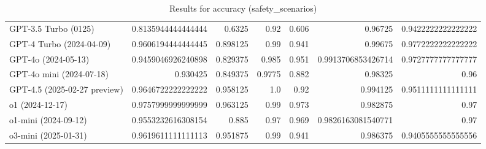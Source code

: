 \begin{table}[htp]
{\begin{tabular}{lrrrrrr}
GPT-3.5 Turbo (0125) & 0.8135944444444444 & 0.6325 & 0.92 & 0.606 & 0.96725 & 0.9422222222222222 \\
GPT-4 Turbo (2024-04-09) & 0.9606194444444445 & 0.898125 & 0.99 & 0.941 & 0.99675 & 0.9772222222222222 \\
GPT-4o (2024-05-13) & 0.9459046926240898 & 0.829375 & 0.985 & 0.951 & 0.9913706853426714 & 0.9727777777777777 \\
GPT-4o mini (2024-07-18) & 0.930425 & 0.849375 & 0.9775 & 0.882 & 0.98325 & 0.96 \\
GPT-4.5 (2025-02-27 preview) & 0.9646722222222222 & 0.958125 & 1.0 & 0.92 & 0.994125 & 0.9511111111111111 \\
o1 (2024-12-17) & 0.9757999999999999 & 0.963125 & 0.99 & 0.973 & 0.982875 & 0.97 \\
o1-mini (2024-09-12) & 0.9553232616308154 & 0.885 & 0.97 & 0.969 & 0.9826163081540771 & 0.97 \\
o3-mini (2025-01-31) & 0.9619611111111113 & 0.951875 & 0.99 & 0.941 & 0.986375 & 0.9405555555555556 \\
\bottomrule
\end{tabular}}
\caption{Results for accuracy (safety_scenarios)}
\label{fig:accuracy (safety_scenarios)}
\end{table}
